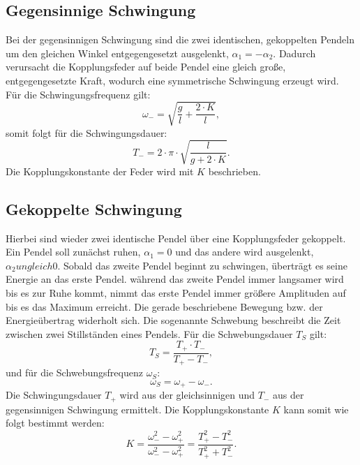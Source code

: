 \subsection{Gegensinnige Schwingung}
Bei der gegensinnigen Schwingung sind die zwei identischen, gekoppelten Pendeln um den gleichen Winkel entgegengesetzt ausgelenkt, $\alpha_1 = - \alpha_2$.
Dadurch verursacht die Kopplungsfeder auf beide Pendel eine gleich große, entgegengesetzte Kraft, wodurch eine symmetrische Schwingung erzeugt wird.
Für die Schwingungsfrequenz gilt:
\begin{equation*}
    \omega_- = \sqrt{\frac{g}{l} + \frac{2 \cdot K}{l}},
\end{equation*}
somit folgt für die Schwingungsdauer:
\begin{equation*}
    T_- =2 \cdot \pi \cdot \sqrt{\frac{l}{g + 2 \cdot K}}.
\end{equation*}
Die Kopplungskonstante der Feder wird mit $K$ beschrieben.

\subsection{Gekoppelte Schwingung}
Hierbei sind wieder zwei identische Pendel über eine Kopplungsfeder gekoppelt.
Ein Pendel soll zunächst ruhen, $\alpha_1 = 0$ und das andere wird ausgelenkt, $\alpha_2 ungleich 0$.
Sobald das zweite Pendel beginnt zu schwingen, überträgt es seine Energie an das erste Pendel.
während das zweite Pendel immer langsamer wird bis es zur Ruhe kommt, nimmt das erste Pendel immer größere Amplituden auf bis es das Maximum erreicht.
Die gerade beschriebene Bewegung bzw. der Energieübertrag widerholt sich.
Die sogenannte Schwebung beschreibt die Zeit zwischen zwei Stillständen eines Pendels.
Für die Schwebungsdauer $T_S$ gilt:
\begin{equation*}
    T_S = \frac{T_+ \cdot T_-}{T_+ - T_-},
\end{equation*}
und für die Schwebungsfrequenz $\omega_S$:
\begin{equation*}
    \omega_S = \omega_+ - \omega_-.
\end{equation*}
Die Schwingungsdauer $T_+$ wird aus der gleichsinnigen und $T_-$ aus der gegensinnigen Schwingung ermittelt.
Die Kopplungskonstante $K$ kann somit wie folgt bestimmt werden:
\begin{equation*}
    K = \frac{\omega_-^2 - \omega_+^2}{\omega_-^2 - \omega_+^2} = \frac{T_+^2 - T_-^2}{T_+^2 + T_-^2}.
\end{equation*}